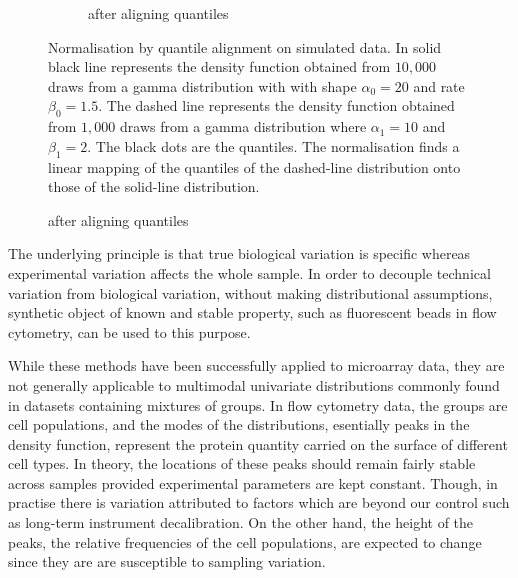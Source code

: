 \begin{figure}[h]
\begin{subfigure}[b]{.5\textwidth}
\caption{after aligning quantiles}
\end{subfigure}
{Normalisation by quantile alignment on simulated data.}
{
In solid black line represents the density function obtained from $10,000$ draws from a gamma distribution
with with shape $\alpha_0=20$ and rate $\beta_0=1.5$.
The dashed line represents the density function obtained from $1,000$ draws from a gamma distribution
where $\alpha_1=10$ and $\beta_1=2$.
The black dots are the quantiles.
The normalisation finds a linear mapping of the quantiles of the dashed-line distribution onto those of the solid-line distribution.
}
\end{figure}


The underlying principle is that true biological variation is specific whereas experimental variation affects the whole sample.
In order to decouple technical variation from biological variation, without making distributional assumptions,
synthetic object of known and stable property, such as fluorescent beads in flow cytometry, can be used to this purpose.

While these methods have been successfully applied to microarray data, they are not generally applicable
to multimodal univariate distributions commonly found in datasets containing mixtures of groups.
In flow cytometry data, the groups are cell populations, and the modes of the distributions, esentially peaks in the density function,
represent the protein quantity carried on the surface of different cell types.
In theory, the locations of these peaks should remain fairly stable across samples provided experimental parameters are kept constant.
Though, in practise there is variation attributed to factors which are beyond our control such as long-term instrument decalibration.
On the other hand, the height of the peaks, the relative frequencies of the cell populations, are expected to change since they are
are susceptible to sampling variation.

